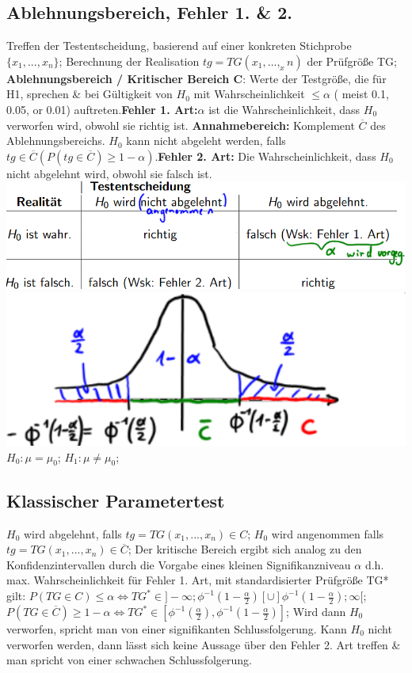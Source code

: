 \subsection{Ablehnungsbereich, Fehler 1. \& 2.}
Treffen der Testentscheidung, basierend auf einer konkreten Stichprobe 
$ \{x_{1}, ..., x_{n} \} $; Berechnung der Realisation $ tg = TG(x_{1},..., _x{n}) $ der Prüfgröße TG; 
\textbf{Ablehnungsbereich / Kritischer Bereich C}: Werte der Testgröße, die für H1, sprechen \& bei Gültigkeit von $ H_{0} $ mit Wahrscheinlichkeit $ \le \alpha $ ( meist 0.1, 0.05, or 0.01) auftreten.\textbf{Fehler 1. Art:}$ \alpha $ ist die Wahrscheinlichkeit, dass $ H_{0} $ verworfen wird, obwohl sie richtig ist.
\textbf{Annahmebereich:} Komplement $ \overline{C} $ des Ablehnungsbereichs. $ H_{0} $ kann nicht abgeleht werden, falls $ tg \in \overline{C} (P(tg \in \overline{C}) \ge 1 - \alpha) $.\textbf{Fehler 2. Art:} Die Wahrscheinlichkeit, dass $ H_{0} $ nicht abgelehnt wird, obwohl sie falsch ist.
\includegraphics[scale=0.25]{./pic/Testzenarien.png}
\includegraphics[scale=0.25]{./pic/StandardnormvalverteilungTestgroese.png}
$H_{0}: \mu = \mu_{0} $; $ H_{1}: \mu \neq \mu_{0} $; 
\subsection{Klassischer Parametertest}
$H_{0} $ wird abgelehnt, falls $ tg = TG( x_{1}, ..., x_{n} ) \in C $; 
$ H_{0} $ wird angenommen falls $ tg = TG(x_{1}, ..., x_{n}) \in \overline{C} $; 
Der kritische Bereich ergibt sich analog zu den Konfidenzintervallen durch die Vorgabe eines kleinen Signifikanzniveau $ \alpha $ d.h. max. Wahrscheinlichkeit für Fehler 1. Art, mit standardisierter Prüfgröße TG* gilt:
$ P (TG \in C) \le \alpha  \Leftrightarrow TG^{*} \in ]-\infty; \phi^{-1}(1- \frac{\alpha}{2}) [ \cup ] \phi^{-1}(1-\frac{\alpha}{2}); \infty [$; 
$ P(TG \in \overline{C}) \ge 1 - \alpha \Leftrightarrow TG^{*} \in [ \phi^{-1}(\frac{\alpha}{2}), \phi^{-1}(1-\frac{\alpha}{2}) ] $; 
Wird dann $ H_{0} $ verworfen, spricht man von einer signifikanten Schlussfolgerung. Kann $ H_{0} $ nicht verworfen werden, dann lässt sich keine Aussage über den Fehler 2. Art treffen \& man spricht von einer schwachen Schlussfolgerung.
